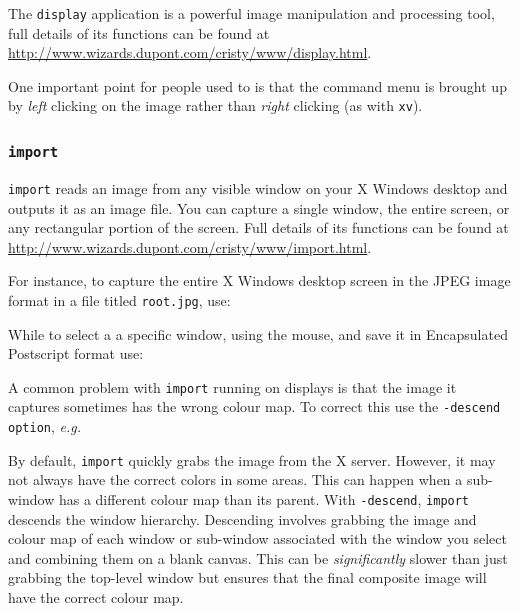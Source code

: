 \documentclass[twoside,11pt]{starlink}
\begin{document}
\begin{terminalv}
\end{terminalv}


The \texttt{display} application is a powerful image manipulation and
processing tool, full details of its functions can be found at
\url{http://www.wizards.dupont.com/cristy/www/display.html}.

One important point for people used to  is
that the command menu is brought up by \emph{left} clicking on the
image rather than \emph{right} clicking (as with \texttt{xv}).

\subsubsection{\texttt{import}}

\texttt{import} reads an image from any visible window on your X Windows
desktop and outputs it as an image file. You can capture a single
window, the entire screen, or any rectangular portion of the screen.
Full details of its functions can be found at \url{http://www.wizards.dupont.com/cristy/www/import.html}.

For instance, to capture the entire X Windows desktop screen in the
JPEG image format in a file titled \texttt{root.jpg}, use:

\begin{terminalv}
\end{terminalv}

While to select a a specific window, using the mouse, and save it in
Encapsulated Postscript format use:

\begin{terminalv}
\end{terminalv}

A common problem with \texttt{import} running on  displays is that the image it captures sometimes has
the wrong colour map. To correct this use the \texttt{-descend option},
\emph{e.g.\ }

\begin{terminalv}
\end{terminalv}

By default, \texttt{import} quickly grabs the image from the X server.
However, it may not always have the correct colors in some areas. This
can happen when a sub-window has a different colour map than its
parent. With \texttt{-descend}, \texttt{import} descends the window
hierarchy. Descending involves grabbing the image and colour map of
each window or sub-window associated with the window you select and
combining them on a blank canvas. This can be \emph{significantly}
slower than just grabbing the top-level window but ensures that the
final composite image will have the correct colour map.
\end{document}
